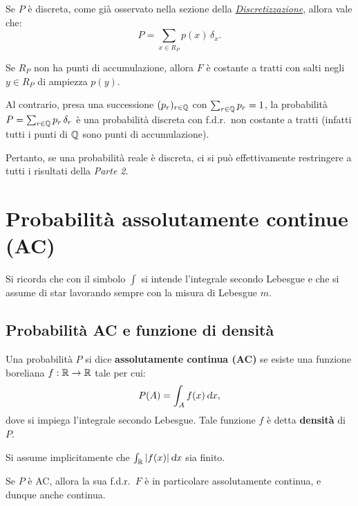 \begin{multicols*}{2}
\begin{remark}
    Se $P$ è discreta, come già osservato nella sezione della \textit{\hyperref[remark:identità_discreta_dirac]{Discretizzazione}},
    allora vale che:
    \[
        P = \sum_{x \in R_P} p(x) \, \delta_x.
    \]
\end{remark}

\begin{remark}
    Se $R_P$ non ha punti di accumulazione, allora $F$ è costante a tratti con salti
    negli $y \in R_P$ di ampiezza $p(y)$. \smallskip


    Al contrario, presa una successione $(p_r)_{r \in \mathbb{Q}}$ con $\sum_{r \in \mathbb{Q}} p_r = 1$,
    la probabilità $P = \sum_{r \in \mathbb{Q}} p_r \, \delta_r$ è una probabilità discreta con
    f.d.r.~non costante a tratti (infatti tutti i punti di $\mathbb{Q}$ sono punti di accumulazione). 
\end{remark}

Pertanto, se una probabilità reale è discreta, ci si può effettivamente restringere a tutti
i risultati della \textit{Parte 2}.

\section{Probabilità assolutamente continue (AC)}

\begin{warn}
    Si ricorda che con il simbolo $\int$ si intende l'integrale
    secondo Lebesgue e che si assume di star lavorando sempre con la
    misura di Lebesgue $m$.
\end{warn}

\subsection{Probabilità AC e funzione di densità}

\begin{definition}
    Una probabilità $P$ si dice \textbf{assolutamente continua (AC)}
    se esiste una funzione
    boreliana $f : \mathbb{R} \to \mathbb{R}$ tale per cui:
    \[
        P(A) = \int_A f(x) \dx,
    \]
    dove si impiega l'integrale secondo Lebesgue. Tale funzione $f$ è
    detta \textbf{densità} di $P$. \smallskip


    Si assume implicitamente che $\int_\RR \abs{f(x)} \dx$ sia finito.
\end{definition}

\begin{remark}
    Se $P$ è AC, allora la sua f.d.r.~$F$ è in particolare
    assolutamente continua, e dunque anche continua.
\end{remark}


\end{multicols*}
